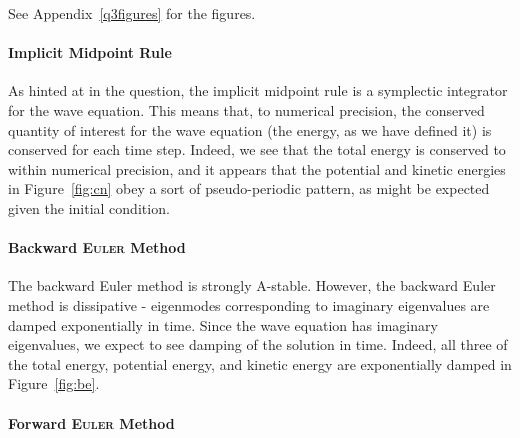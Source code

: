 \vspace{0.5cm}
\begin{solution}
See Appendix~\ref{q3figures} for the figures.

\paragraph*{Implicit Midpoint Rule}
As hinted at in the question, the implicit midpoint rule is a symplectic integrator for the wave equation.
This means that, to numerical precision, the conserved quantity of interest for the wave equation (the energy, as we have defined it) is conserved for each time step.
Indeed, we see that the total energy is conserved to within numerical precision, and it appears that the potential and kinetic energies in Figure~\ref{fig:cn} obey a sort of pseudo-periodic pattern, as might be expected given the initial condition.

\paragraph*{Backward \textsc{Euler} Method}
The backward Euler method is strongly A-stable.
However, the backward Euler method is dissipative - eigenmodes corresponding to imaginary eigenvalues are damped exponentially in time.
Since the wave equation has imaginary eigenvalues, we expect to see damping of the solution in time.
Indeed, all three of the total energy, potential energy, and kinetic energy are exponentially damped in Figure~\ref{fig:be}.

\paragraph*{Forward \textsc{Euler} Method}
%


\end{solution}
